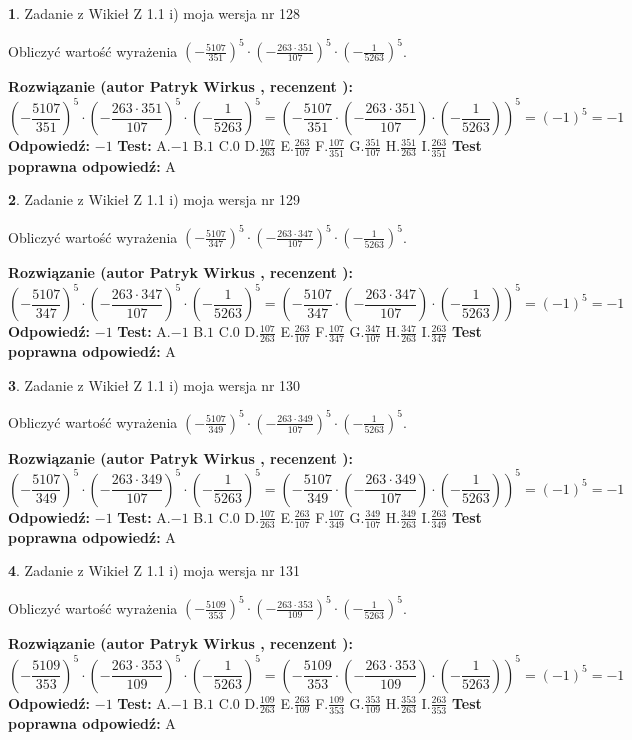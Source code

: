 \documentclass[12pt, a4paper]{article}
\theoremstyle{definition} %
\newtheorem{zad}{}
\newcommand{\zadStart}[1]{\begin{zad}#1\newline}
\newcommand{\zadStop}{\end{zad}}
\newcommand{\rozwStart}[2]{\noindent \textbf{Rozwiązanie (autor #1 , recenzent #2): }\newline}
\newcommand{\rozwStop}{\newline}
\newcommand{\odpStart}{\noindent \textbf{Odpowiedź:}\newline}
\newcommand{\odpStop}{\newline}
\newcommand{\testStart}{\noindent \textbf{Test:}\newline}
\newcommand{\testStop}{\newline}
\newcommand{\kluczStart}{\noindent \textbf{Test poprawna odpowiedź:}\newline}
\newcommand{\kluczStop}{\newline}
\begin{document}
\zadStart{Zadanie z Wikieł Z 1.1 i) moja wersja nr 128}

Obliczyć wartość wyrażenia $(-\frac{5107}{351})^{5} \cdot (-\frac{263 \cdot 351}{107})^{5} \cdot (-\frac{1}{5263})^{5}$.
\zadStop
\rozwStart{Patryk Wirkus}{}
$$(-\frac{5107}{351})^{5} \cdot (-\frac{263 \cdot 351}{107})^{5} \cdot (-\frac{1}{5263})^{5} = (-\frac{5107}{351} \cdot (-\frac{263 \cdot 351}{107}) \cdot (-\frac{1}{5263}))^{5} = (-1)^{5} = -1$$
\rozwStop
\odpStart
$-1$
\odpStop
\testStart
A.$-1$ B.$1$ C.$0$ D.$\frac{107}{263}$ E.$\frac{263}{107}$
F.$\frac{107}{351}$ G.$\frac{351}{107}$
H.$\frac{351}{263}$
I.$\frac{263}{351}$
\testStop
\kluczStart
A
\kluczStop



\zadStart{Zadanie z Wikieł Z 1.1 i) moja wersja nr 129}

Obliczyć wartość wyrażenia $(-\frac{5107}{347})^{5} \cdot (-\frac{263 \cdot 347}{107})^{5} \cdot (-\frac{1}{5263})^{5}$.
\zadStop
\rozwStart{Patryk Wirkus}{}
$$(-\frac{5107}{347})^{5} \cdot (-\frac{263 \cdot 347}{107})^{5} \cdot (-\frac{1}{5263})^{5} = (-\frac{5107}{347} \cdot (-\frac{263 \cdot 347}{107}) \cdot (-\frac{1}{5263}))^{5} = (-1)^{5} = -1$$
\rozwStop
\odpStart
$-1$
\odpStop
\testStart
A.$-1$ B.$1$ C.$0$ D.$\frac{107}{263}$ E.$\frac{263}{107}$
F.$\frac{107}{347}$ G.$\frac{347}{107}$
H.$\frac{347}{263}$
I.$\frac{263}{347}$
\testStop
\kluczStart
A
\kluczStop



\zadStart{Zadanie z Wikieł Z 1.1 i) moja wersja nr 130}

Obliczyć wartość wyrażenia $(-\frac{5107}{349})^{5} \cdot (-\frac{263 \cdot 349}{107})^{5} \cdot (-\frac{1}{5263})^{5}$.
\zadStop
\rozwStart{Patryk Wirkus}{}
$$(-\frac{5107}{349})^{5} \cdot (-\frac{263 \cdot 349}{107})^{5} \cdot (-\frac{1}{5263})^{5} = (-\frac{5107}{349} \cdot (-\frac{263 \cdot 349}{107}) \cdot (-\frac{1}{5263}))^{5} = (-1)^{5} = -1$$
\rozwStop
\odpStart
$-1$
\odpStop
\testStart
A.$-1$ B.$1$ C.$0$ D.$\frac{107}{263}$ E.$\frac{263}{107}$
F.$\frac{107}{349}$ G.$\frac{349}{107}$
H.$\frac{349}{263}$
I.$\frac{263}{349}$
\testStop
\kluczStart
A
\kluczStop



\zadStart{Zadanie z Wikieł Z 1.1 i) moja wersja nr 131}

Obliczyć wartość wyrażenia $(-\frac{5109}{353})^{5} \cdot (-\frac{263 \cdot 353}{109})^{5} \cdot (-\frac{1}{5263})^{5}$.
\zadStop
\rozwStart{Patryk Wirkus}{}
$$(-\frac{5109}{353})^{5} \cdot (-\frac{263 \cdot 353}{109})^{5} \cdot (-\frac{1}{5263})^{5} = (-\frac{5109}{353} \cdot (-\frac{263 \cdot 353}{109}) \cdot (-\frac{1}{5263}))^{5} = (-1)^{5} = -1$$
\rozwStop
\odpStart
$-1$
\odpStop
\testStart
A.$-1$ B.$1$ C.$0$ D.$\frac{109}{263}$ E.$\frac{263}{109}$
F.$\frac{109}{353}$ G.$\frac{353}{109}$
H.$\frac{353}{263}$
I.$\frac{263}{353}$
\testStop
\kluczStart
A
\kluczStop
\end{document}
